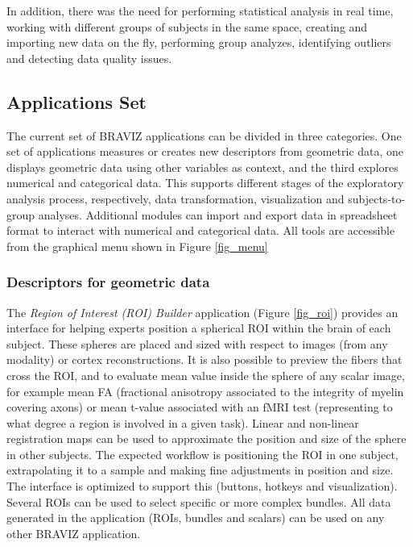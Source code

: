 \documentclass{frontiersHLTH}
\begin{document}
In addition, there was the need for performing statistical analysis in real time, working with different groups of subjects in the same space, creating and importing new data on the fly, performing group analyzes, identifying outliers and detecting data quality issues. 



\subsection{Applications Set}


The current set of BRAVIZ applications can be divided in three categories. One set of applications measures or creates new descriptors from geometric data, one displays geometric data using other variables as context, and the third explores numerical and categorical data. This supports different stages of the exploratory analysis process, respectively, data transformation, visualization and subjects-to-group analyses. Additional modules can import and export data in spreadsheet format to interact with numerical and categorical data. All tools  are accessible from the graphical menu shown in Figure \ref{fig_menu}


\subsubsection{Descriptors for geometric data}

The \emph{Region of Interest (ROI) Builder} application (Figure \ref{fig_roi}) provides an interface for helping experts position a spherical ROI within the brain of each subject. These spheres are placed and sized with respect to images (from any modality) or cortex reconstructions. It is also possible to preview the fibers that cross the ROI, and to evaluate mean value inside the sphere of any scalar image, for example mean FA (fractional anisotropy associated to the integrity of myelin covering axons) or mean t-value associated with an fMRI test (representing to what degree a region is involved in a given task). 
Linear and non-linear registration maps can be used to approximate the position and size of the sphere in other subjects. The expected workflow is positioning the ROI in one subject, extrapolating it to a sample and making fine adjustments in position and size. The interface is optimized to support this (buttons, hotkeys and visualization). Several ROIs can be used to select specific or more complex bundles. All data generated in the application (ROIs, bundles and scalars) can be used on any other BRAVIZ application. 
\end{document}

